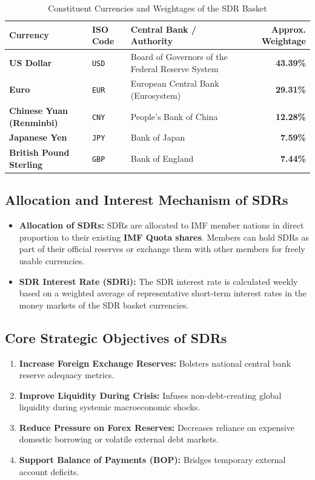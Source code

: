 \begin{table}[htbp]
    \centering
    \small
    \renewcommand{\arraystretch}{1.2}
    \begin{tabularx}{\textwidth}{llXr}
        \toprule
        \textbf{Currency} & \textbf{ISO Code} & \textbf{Central Bank / Authority} & \textbf{Approx. Weightage} \\
        \midrule
        \textbf{US Dollar} & \texttt{USD} & Board of Governors of the Federal Reserve System & \textbf{43.39\%} \\
        \textbf{Euro} & \texttt{EUR} & European Central Bank (Eurosystem) & \textbf{29.31\%} \\
        \textbf{Chinese Yuan (Renminbi)} & \texttt{CNY} & People's Bank of China & \textbf{12.28\%} \\
        \textbf{Japanese Yen} & \texttt{JPY} & Bank of Japan & \textbf{7.59\%} \\
        \textbf{British Pound Sterling} & \texttt{GBP} & Bank of England & \textbf{7.44\%} \\
        \bottomrule
    \end{tabularx}
    \caption{Constituent Currencies and Weightages of the SDR Basket}
    \label{tab:sdr_weights}
\end{table}

\subsection{Allocation and Interest Mechanism of SDRs}
\begin{itemize}[leftmargin=*]
    \item \textbf{Allocation of SDRs:} SDRs are allocated to IMF member nations in direct proportion to their existing \textbf{IMF Quota shares}. Members can hold SDRs as part of their official reserves or exchange them with other members for freely usable currencies.
    \item \textbf{SDR Interest Rate (SDRi):} The SDR interest rate is calculated weekly based on a weighted average of representative short-term interest rates in the money markets of the SDR basket currencies.
\end{itemize}

\subsection{Core Strategic Objectives of SDRs}
\begin{enumerate}[leftmargin=*]
    \item \textbf{Increase Foreign Exchange Reserves:} Bolsters national central bank reserve adequacy metrics.
    \item \textbf{Improve Liquidity During Crisis:} Infuses non-debt-creating global liquidity during systemic macroeconomic shocks.
    \item \textbf{Reduce Pressure on Forex Reserves:} Decreases reliance on expensive domestic borrowing or volatile external debt markets.
    \item \textbf{Support Balance of Payments (BOP):} Bridges temporary external account deficits.
\end{enumerate}


